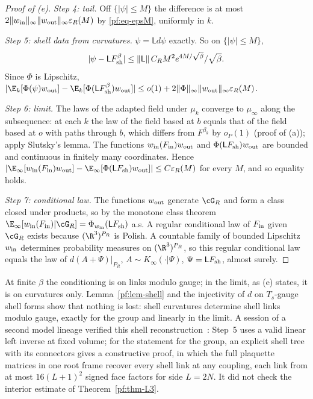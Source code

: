 \begin{proof}[Proof of (e)]
\emph{Step 4: tail.} Off $\{|\psi|\le M\}$ the difference is at most $2\|w_{\rm in}\|_\infty\|w_{\rm out}\|_\infty\varepsilon_R(M)$ by \eqref{pf:eq-epsM}, uniformly in $k$.

\emph{Step 5: shell data from curvatures.} $\psi=\mathsf Ld\psi$ exactly. So on $\{|\psi|\le M\}$,
\[|\psi-\mathsf LF^{\beta}_{\rm sh}|\le\|\mathsf L\|\,C_RM^2e^{4M/\sqrt\beta}/\sqrt\beta .\] Since $\Phi$ is Lipschitz, $|\E_k[\Phi(\psi)w_{\rm out}]-\E_k[\Phi(\mathsf LF^\beta_{\rm sh})w_{\rm out}]|\le o(1)+2\|\Phi\|_\infty\|w_{\rm out}\|_\infty\varepsilon_R(M)$.

\emph{Step 6: limit.} The laws of the adapted field under $\mu_k$ converge to $\mu_\infty$ along the subsequence: at each $k$ the law of the field based at $b$ equals that of the field based at $o$ with paths through $b$, which differs from $F^{\beta_k}$ by $o_P(1)$ (proof of (a)); apply Slutsky's lemma. The functions $w_{\rm in}(F_{\rm in})w_{\rm out}$ and $\Phi(\mathsf LF_{\rm sh})w_{\rm out}$ are bounded and continuous in finitely many coordinates. Hence
$|\E_\infty[w_{\rm in}(F_{\rm in})w_{\rm out}]-\E_\infty[\Phi(\mathsf LF_{\rm sh})w_{\rm out}]|\le C\varepsilon_R(M)$ for every $M$, and so equality holds.

\emph{Step 7: conditional law.} The functions $w_{\rm out}$ generate $\cG_R$ and form a class closed under products, so by the monotone class theorem $\E_\infty[w_{\rm in}(F_{\rm in})|\cG_R]=\Phi_{w_{\rm in}}(\mathsf LF_{\rm sh})$ a.s. A regular conditional law of $F_{\rm in}$ given $\cG_R$ exists because $(\R^3)^{P_R}$ is Polish. A countable family of bounded Lipschitz $w_{\rm in}$ determines probability measures on $(\R^3)^{P_R}$, so this regular conditional law equals the law of $d(A+\Psi)|_{P_R}$, $A\sim K_\infty(\cdot|\Psi)$, $\Psi=\mathsf LF_{\rm sh}$, almost surely.
\end{proof}

At finite $\beta$ the conditioning is on links modulo gauge; in the limit, as (e) states, it is on curvatures only. Lemma~\ref{pf:lem-shell} and the injectivity of $d$ on $T_s$-gauge shell forms show that nothing is lost: shell curvatures determine shell links modulo gauge, exactly for the group and linearly in the limit. A session of a second model lineage verified this shell reconstruction~\cite[comment 7104825691]{RepoThread}: Step~5 uses a valid linear left inverse at fixed volume; for the statement for the group, an explicit shell tree with its connectors gives a constructive proof, in which the full plaquette matrices in one root frame recover every shell link at any coupling, each link from at most $16(L+1)^2$ signed face factors for side $L=2N$. It did not check the interior estimate of Theorem~\ref{pf:thm-L3}.

